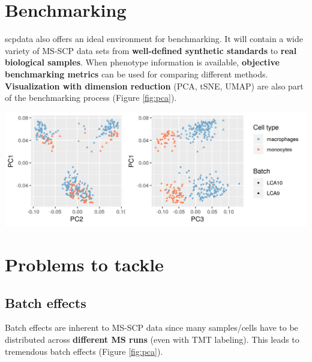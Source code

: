 \documentclass{article}
\newcommand{\hcode}[2][lgray]{{\ttfamily\color{vdgray}\colorbox{#1}{#2}}}
\begin{document}
\begin{multicols}{2}
\begin{minipage}[t]{\linewidth}
  \section*{\huge Benchmarking}
  \large
  \hcode{scpdata} also offers an ideal environment for benchmarking. It will contain a wide variety of MS-SCP data sets from \textbf{well-defined synthetic standards} to \textbf{real biological samples}. When phenotype information is available, \textbf{objective benchmarking metrics} can be used for comparing different methods. \textbf{Visualization with dimension reduction} (PCA, tSNE, UMAP) are also part of the benchmarking process (Figure \ref{fig:pca}).
  \begin{center}
    \includegraphics[width=\textwidth]{figs/PCA.png}
  \end{center}
  \label{fig:pca}

\end{minipage}

\noindent
\begin{minipage}[t]{\linewidth}
  \vspace{0.55cm}
  \section*{\huge Problems to tackle}
  \subsection*{Batch effects}
  \large
  Batch effects are inherent to MS-SCP data since many samples/cells have to be distributed across \textbf{different MS runs} (even with TMT labeling). This leads to tremendous batch effects (Figure \ref{fig:pca}).
  

\end{minipage}
\end{multicols}
\end{document}
